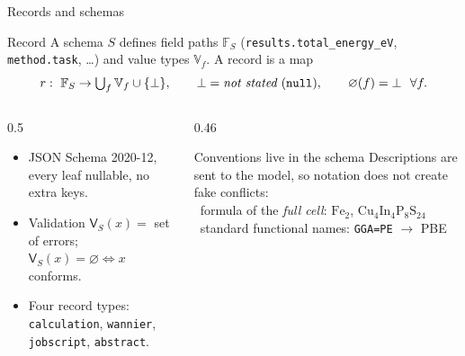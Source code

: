 \documentclass[aspectratio=169,10pt,t]{beamer}
\newcommand{\Fset}{\mathbb{F}}
\newcommand{\Vset}{\mathbb{V}}
\newcommand{\nil}{\varnothing}
\newcommand{\valid}{\mathsf{V}}
\newcommand{\code}[1]{\texttt{#1}}
\begin{document}
\begin{frame}{Records and schemas}
\begin{defbox}{Record}
A schema \(S\) defines field paths \(\Fset_S\) (\code{results.total\_energy\_eV}, \code{method.task}, \dots) and value types \(\Vset_f\).
A record is a map
\[
  r:\ \Fset_S\to\textstyle\bigcup_f\Vset_f\cup\{\bot\},\qquad \bot=\text{\emph{not stated}} \;(\texttt{null}),\qquad \nil(f)=\bot\ \ \forall f .
\]
\end{defbox}
\begin{columns}[T]
\begin{column}{0.5\textwidth}
\small
\begin{itemize}
\item JSON Schema 2020-12, every leaf nullable, no extra keys.
\item Validation \(\valid_S(x)=\) set of errors; \(\valid_S(x)=\varnothing\iff x\) conforms.
\item Four record types: \code{calculation}, \code{wannier}, \code{jobscript}, \code{abstract}.
\end{itemize}
\end{column}
\begin{column}{0.46\textwidth}
\begin{warnbox}{Conventions live in the schema}
\footnotesize
Descriptions are sent to the model, so notation does not create fake conflicts:\\[1pt]
\textbullet\ formula of the \emph{full cell}: \(\mathrm{Fe_2}\), \(\mathrm{Cu_4In_4P_8S_{24}}\)\\
\textbullet\ standard functional names: \code{GGA=PE} \(\to\) PBE
\end{warnbox}
\end{column}
\end{columns}
\end{frame}
\end{document}
